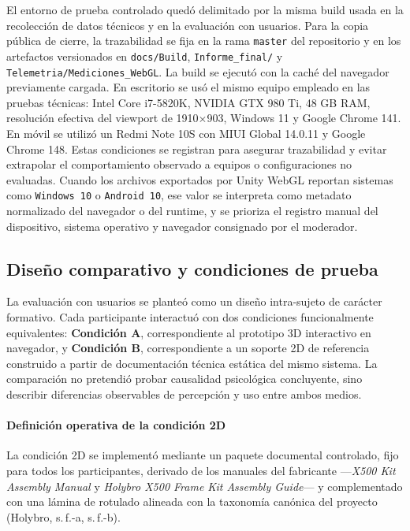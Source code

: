 El entorno de prueba controlado quedó delimitado por la misma build usada en la recolección de datos técnicos y en la evaluación con usuarios. Para la copia pública de cierre, la trazabilidad se fija en la rama \texttt{master} del repositorio y en los artefactos versionados en \texttt{docs/Build}, \texttt{Informe\_final/} y \texttt{Telemetria/Mediciones\_WebGL}. La build se ejecutó con la caché del navegador previamente cargada. En escritorio se usó el mismo equipo empleado en las pruebas técnicas: Intel Core i7-5820K, NVIDIA GTX 980 Ti, 48 GB RAM, resolución efectiva del viewport de 1910\(\times\)903, Windows 11 y Google Chrome 141. En móvil se utilizó un Redmi Note 10S con MIUI Global 14.0.11 y Google Chrome 148. Estas condiciones se registran para asegurar trazabilidad y evitar extrapolar el comportamiento observado a equipos o configuraciones no evaluadas. Cuando los archivos exportados por Unity WebGL reportan sistemas como \texttt{Windows 10} o \texttt{Android 10}, ese valor se interpreta como metadato normalizado del navegador o del runtime, y se prioriza el registro manual del dispositivo, sistema operativo y navegador consignado por el moderador.

\subsection{Diseño comparativo y condiciones de prueba}

La evaluación con usuarios se planteó como un diseño intra-sujeto de carácter formativo. Cada participante interactuó con dos condiciones funcionalmente equivalentes: \textbf{Condición A}, correspondiente al prototipo 3D interactivo en navegador, y \textbf{Condición B}, correspondiente a un soporte 2D de referencia construido a partir de documentación técnica estática del mismo sistema. La comparación no pretendió probar causalidad psicológica concluyente, sino describir diferencias observables de percepción y uso entre ambos medios.

\paragraph{Definición operativa de la condición 2D} La condición 2D se implementó mediante un paquete documental controlado, fijo para todos los participantes, derivado de los manuales del fabricante ---\textit{X500 Kit Assembly Manual} y \textit{Holybro X500 Frame Kit Assembly Guide}--- y complementado con una lámina de rotulado alineada con la taxonomía canónica del proyecto (Holybro, s.\,f.-a, s.\,f.-b).

